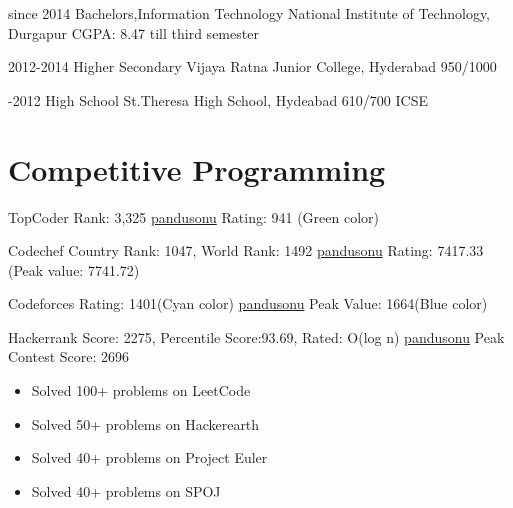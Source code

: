 \documentclass[]{friggeri-cv-a4}
\begin{document}
\begin{entrylist}

\entry
{since 2014}
{Bachelors,{\normalfont Information Technology}}
{National Institute of Technology, Durgapur}
{CGPA: 8.47 till third semester}
{}

\entry
{2012-2014}
{Higher Secondary}
{Vijaya Ratna Junior College, Hyderabad}
{950/1000}
{}

\entry
{-2012}
{High School}
{St.Theresa High School, Hydeabad}
{610/700 ICSE}
{}

\end{entrylist}


\section{\normalfont Competitive Programming}

\begin{entrylist}

\entry
{TopCoder}
{Rank: 3,325}
{\href{https://www.topcoder.com/members/pandusonu/}{pandusonu}}
{Rating: 941 (Green color)}

\entry
{Codechef}
{Country Rank: 1047, World Rank: 1492}
{\href{http://www.codechef.com/users/pandusonu}{pandusonu}}
{Rating: 7417.33 (Peak value: 7741.72)}

\entry
{Codeforces}
{Rating: 1401(Cyan color)}
{\href{http://codeforces.com/profile/pandusonu}{pandusonu}}
{Peak Value: 1664(Blue color)}

\entry
{Hackerrank}
{Score: 2275, Percentile Score:93.69, Rated: O(log n)}
{\href{https://www.hackerrank.com/pandusonu}{pandusonu}}
{Peak Contest Score: 2696}

\end{entrylist}
\begin{itemize}
\item Solved 100+ problems on LeetCode
\item Solved 50+ problems on Hackerearth
\item Solved 40+ problems on Project Euler
\item Solved 40+ problems on SPOJ
\end{itemize}

\end{document}
